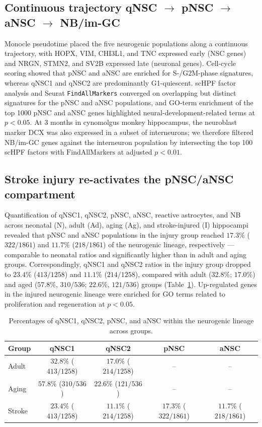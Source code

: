 \documentclass[11pt]{article}
\begin{document}
\subsection{Continuous trajectory qNSC $\to$ pNSC $\to$ aNSC $\to$ NB/im-GC}
Monocle pseudotime placed the five neurogenic populations along a continuous trajectory, with HOPX, VIM, CHI3L1, and TNC expressed early (NSC genes) and NRGN, STMN2, and SV2B expressed late (neuronal genes). Cell-cycle scoring showed that pNSC and aNSC are enriched for S-/G2M-phase signatures, whereas qNSC1 and qNSC2 are predominantly G1-quiescent. scHPF factor analysis and Seurat \texttt{FindAllMarkers} converged on overlapping but distinct signatures for the pNSC and aNSC populations, and GO-term enrichment of the top 1000 pNSC and aNSC genes highlighted neural-development-related terms at $p < 0.05$. At 3 months in cynomolgus monkey hippocampus, the neuroblast marker DCX was also expressed in a subset of interneurons; we therefore filtered NB/im-GC genes against the interneuron population by intersecting the top 100 scHPF factors with $\mathrm{FindAllMarkers}$ at adjusted $p < 0.01$.

\subsection{Stroke injury re-activates the pNSC/aNSC compartment}
Quantification of qNSC1, qNSC2, pNSC, aNSC, reactive astrocytes, and NB across neonatal (N), adult (Ad), aging (Ag), and stroke-injured (I) hippocampi revealed that pNSC and aNSC populations in the injury group reached $17.3\%$ ($322/1861$) and $11.7\%$ ($218/1861$) of the neurogenic lineage, respectively --- comparable to neonatal ratios and significantly higher than in adult and aging groups. Correspondingly, qNSC1 and qNSC2 ratios in the injury group dropped to $23.4\%$ ($413/1258$) and $11.1\%$ ($214/1258$), compared with adult ($32.8\%$; $17.0\%$) and aged ($57.8\%$, $310/536$; $22.6\%$, $121/536$) groups (Table~\ref{tab:ratios}). Up-regulated genes in the injured neurogenic lineage were enriched for GO terms related to proliferation and regeneration at $p < 0.05$.

\begin{table}[h]
\centering
\caption{Percentages of qNSC1, qNSC2, pNSC, and aNSC within the neurogenic lineage across groups.}
\label{tab:ratios}
\begin{tabular}{lcccc}
\toprule
Group & qNSC1 & qNSC2 & pNSC & aNSC \\
\midrule
Adult & $32.8\%$ ($413/1258$) & $17.0\%$ ($214/1258$) & -- & -- \\
Aging & $57.8\%$ ($310/536$) & $22.6\%$ ($121/536$) & -- & -- \\
Stroke & $23.4\%$ ($413/1258$) & $11.1\%$ ($214/1258$) & $17.3\%$ ($322/1861$) & $11.7\%$ ($218/1861$) \\
\bottomrule
\end{tabular}
\end{table}
\end{document}
